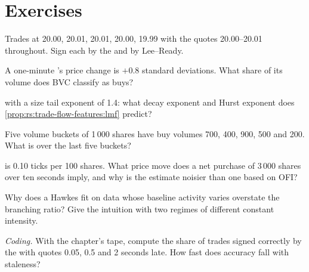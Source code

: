 \section{Exercises}

\begin{exercise}[$\star$]\label{exo:rs:trade-flow-features:1}
Trades at 20.00, 20.01, 20.01, 20.00, 19.99 with the quotes 20.00--20.01 throughout. Sign each by the  and by Lee--Ready.
\end{exercise}

\begin{exercise}[$\star$]\label{exo:rs:trade-flow-features:2}
A one-minute 's price change is $+0.8$ standard deviations. What share of its volume does BVC classify as buys?
\end{exercise}

\begin{exercise}[$\star$]\label{exo:rs:trade-flow-features:3}
 with a size tail exponent of 1.4: what decay exponent and Hurst exponent does \cref{prop:rs:trade-flow-features:lmf} predict?
\end{exercise}

\begin{exercise}[$\star\star$]\label{exo:rs:trade-flow-features:4}
Five volume buckets of 1\,000 shares have buy volumes 700, 400, 900, 500 and 200. What is  over the last five buckets?
\end{exercise}

\begin{exercise}[$\star\star$]\label{exo:rs:trade-flow-features:5}
 is 0.10 ticks per 100 shares. What price move does a net purchase of 3\,000 shares over ten seconds imply, and why is the
estimate noisier than one based on OFI?
\end{exercise}

\begin{exercise}[$\star\star$]\label{exo:rs:trade-flow-features:6}
Why does a Hawkes fit on data whose baseline activity varies overstate the branching ratio? Give the intuition with two regimes of
different constant intensity.
\end{exercise}

\begin{exercise}[$\star\star\star$]\label{exo:rs:trade-flow-features:7}
\emph{Coding.} With the chapter's tape, compute the share of trades signed correctly by the  with quotes 0.05, 0.5 and 2 seconds
late. How fast does accuracy fall with staleness?
\end{exercise}

